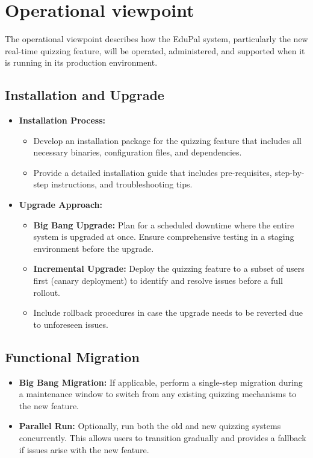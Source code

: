 \section{Operational viewpoint}

The operational viewpoint describes how the EduPal system, particularly the new real-time quizzing feature, will be operated, administered, and supported when it is running in its production environment.


\subsection{Installation and Upgrade}

\begin{itemize}
    \item \textbf{Installation Process:}
          \begin{itemize}
              \item Develop an installation package for the quizzing feature that includes all necessary binaries, configuration files, and dependencies.
              \item Provide a detailed installation guide that includes pre-requisites, step-by-step instructions, and troubleshooting tips.
          \end{itemize}
    \item \textbf{Upgrade Approach:}
          \begin{itemize}
              \item \textbf{Big Bang Upgrade:} Plan for a scheduled downtime where the entire system is upgraded at once. Ensure comprehensive testing in a staging environment before the upgrade.
              \item \textbf{Incremental Upgrade:} Deploy the quizzing feature to a subset of users first (canary deployment) to identify and resolve issues before a full rollout.
              \item Include rollback procedures in case the upgrade needs to be reverted due to unforeseen issues.
          \end{itemize}
\end{itemize}


\subsection{Functional Migration}

\begin{itemize}
    \item \textbf{Big Bang Migration:} If applicable, perform a single-step migration during a maintenance window to switch from any existing quizzing mechanisms to the new feature.
    \item \textbf{Parallel Run:} Optionally, run both the old and new quizzing systems concurrently. This allows users to transition gradually and provides a fallback if issues arise with the new feature.
\end{itemize}


